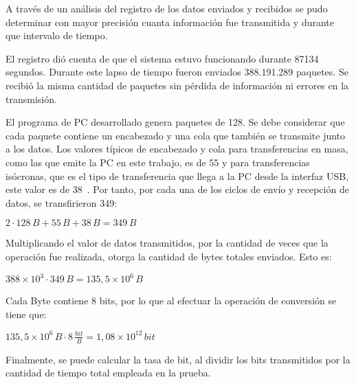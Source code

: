 A través de un análisis del registro de los datos enviados y recibidos se pudo determinar con mayor precisión cuanta información fue transmitida y durante que intervalo de tiempo.

El registro dió cuenta de que el sistema estuvo funcionando durante 87134 segundos.
Durante este lapso de tiempo fueron enviados 388.191.289 paquetes. Se recibió la misma cantidad de paquetes sin pérdida de información ni errores en la transmisión. 

El programa de PC desarrollado genera paquetes de \SI{128}{\byte}. Se debe considerar que cada paquete contiene un encabezado y una cola que también se transmite junto a los datos. Los valores típicos de encabezado y cola para transferencias en masa, como las que emite la PC en este trabajo, es de \SI{55}{\byte} y para transferencias isócronas, que es el tipo de transferencia que llega a la PC desde la interfaz USB, este valor es de \SI{38}{\byte}~\cite{USBspec}. Por tanto, por cada una de los ciclos de envío y recepción de datos, se transfirieron \SI{349}{\byte}:

\begin{center}
	\begin{math}
		2 \cdot 128\,B + 55\,B + 38\,B = 349\,B 
	\end{math}
\end{center}

Multiplicando el valor de datos transmitidos, por la cantidad de veces que la operación fue realizada, otorga la cantidad de bytes totales enviados. Esto es:

\begin{center}
	\begin{math}
		388\times 10^3 \cdot 349\,B = 135,5\times 10^6\,B
	\end{math}
\end{center}

Cada Byte contiene 8 bits, por lo que al efectuar la operación de conversión se tiene que:

\begin{center}
	\begin{math}
		135,5\times 10^6\,B \cdot 8\,\frac{\displaystyle bit}{\displaystyle B} = 1,08\times 10^{12}\,bit
	\end{math}
\end{center}

Finalmente, se puede calcular la tasa de bit, al dividir los bits transmitidos por la cantidad de tiempo total empleada en la prueba. 

